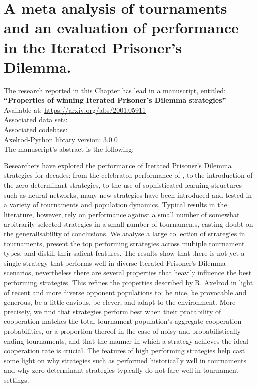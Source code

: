 \chapter{A meta analysis of tournaments and an evaluation of performance in the
Iterated Prisoner's Dilemma.}\label{chapter:meta_tournaments}

\begin{center}
    The research reported in this Chapter has lead in a manuscript, entitled: \\
    \textbf{``Properties of winning Iterated Prisoner's Dilemma strategies''} \\
    Available at: \url{https://arxiv.org/abs/2001.05911} \\
    Associated data sets: \cite{Glynatsi2019_meta, Glynatsi2019_meta_raw_data} \\
    Associated codebase: \cite{Glynatsi_2020_meta_repo} \\
    Axelrod-Python library version: 3.0.0 \\ \vspace{.5cm}
    The manuscript's abstract is the following:
\end{center}

Researchers have explored the performance of Iterated Prisoner's Dilemma strategies
for decades: from the celebrated performance of \TitForTat, to the
introduction of the zero-determinant strategies, to the use of sophisticated learning
structures such as neural networks, many new strategies have been introduced and tested
in a variety of tournaments and population dynamics. Typical results in the literature,
however, rely on performance against a small number of somewhat arbitrarily selected
strategies in a small number of tournaments, casting doubt on the generalisability
of conclusions. We analyse a large collection of \numberofstrategies
strategies in \numberofalltournaments tournaments, present the top performing strategies across multiple
tournament types, and distill their salient features.
The results show that there is not yet a single
strategy that performs well in diverse Iterated Prisoner's Dilemma scenarios,
nevertheless there are several properties that heavily influence the best performing
strategies. This refines the properties described by R. Axelrod in light of
recent and more diverse opponent populations to: be nice, be provocable and generous,
be a little envious, be clever, and adapt to the environment. More precisely,
we find that strategies perform best when their probability of cooperation
matches the total tournament population's aggregate cooperation probabilities,
or a proportion thereof in the case of noisy and probabilistically ending tournaments,
and that the manner in which a strategy achieves the ideal cooperation rate is crucial.
The features of high performing strategies help cast some light on why strategies such as \TitForTat
performed historically well in tournaments and why zero-determinant strategies
typically do not fare well in tournament settings.

